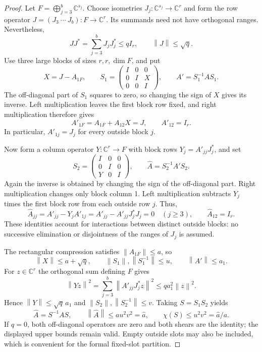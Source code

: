 \documentclass[11pt]{article}
\theoremstyle{remark}
\newcommand{\C}{\mathbb C}
\newcommand{\norm}[1]{\left\lVert#1\right\rVert}
\numberwithin{equation}{section}
\begin{document}
\begin{proof}
Let $F=\bigoplus_{j=3}^b\C^{s_j}$. Choose isometries
$J_j:\C^{s_j}\to\C^r$ and form the row operator
$J=(J_3\ \cdots\ J_b):F\to\C^r$. Its summands need not have orthogonal
ranges. Nevertheless,
\[
 JJ^*=\sum_{j=3}^b J_jJ_j^*\le qI_r,\qquad \norm J\le\sqrt q.
\]
Use three large blocks of sizes $r,r,\dim F$, and put
\[
 X=J-A_{1F},\qquad
 S_1=\begin{pmatrix}I&0&0\\0&I&X\\0&0&I\end{pmatrix},\qquad
 A'=S_1^{-1}AS_1.
\]
The off-diagonal part of $S_1$ squares to zero, so changing the sign of $X$
gives its inverse. Left multiplication leaves the first block row fixed, and
right multiplication therefore gives
\[
 A'_{1F}=A_{1F}+A_{12}X=J,\qquad A'_{12}=I_r.
\]
In particular, $A'_{1j}=J_j$ for every outside block $j$.

Now form a column operator $Y:\C^r\to F$ with block rows
$Y_j=A'_{jj}J_j^*$, and set
\[
 S_2=\begin{pmatrix}I&0&0\\0&I&0\\Y&0&I\end{pmatrix},\qquad
 \widehat A=S_2^{-1}A'S_2.
\]
Again the inverse is obtained by changing the sign of the off-diagonal part.
Right multiplication changes only block column 1. Left multiplication
subtracts $Y_j$ times the first block row from each outside row $j$. Thus,
\begin{equation}\label{eq:shearzero}
 \widehat A_{jj}=A'_{jj}-Y_jA'_{1j}
 =A'_{jj}-A'_{jj}J_j^*J_j=0\quad(j\ge3),\qquad
 \widehat A_{12}=I_r.
\end{equation}
These identities account for interactions between distinct outside blocks:
no successive elimination or disjointness of the ranges of $J_j$ is assumed.

The rectangular compression satisfies $\norm{A_{1F}}\le a$, so
\[
 \norm X\le a+\sqrt q,\qquad
 \norm{S_1},\norm{S_1^{-1}}\le u,\qquad \norm{A'}\le a_1.
\]
For $z\in\C^r$ the orthogonal sum defining $F$ gives
\[
 \norm{Yz}^2=\sum_{j=3}^b\norm{A'_{jj}J_j^*z}^2
 \le q a_1^2\norm z^2.
\]
Hence $\norm Y\le\sqrt q\,a_1$ and
$\norm{S_2},\norm{S_2^{-1}}\le v$. Taking $S=S_1S_2$ yields
\begin{equation}\label{eq:telescope}
 \widehat A=S^{-1}AS,\qquad \norm{\widehat A}\le au^2v^2=\widehat a,
 \qquad \chi(S)\le u^2v^2=\widehat a/a.
\end{equation}
If $q=0$, both off-diagonal operators are zero and both shears are the
identity; the displayed upper bounds remain valid. Empty outside slots may
also be included, which is convenient for the formal fixed-slot partition.


\end{proof}
\end{document}
